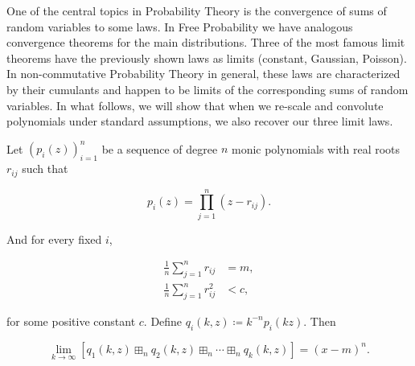 One of the central topics in Probability Theory is the convergence of sums of random variables to some laws. In Free Probability we have analogous convergence theorems for the main distributions. Three of the most famous limit theorems have the previously shown laws as limits (constant, Gaussian, Poisson). In non-commutative Probability Theory in general, these laws are characterized by their cumulants and happen to be limits of the corresponding sums of random variables. In what follows, we will show that when we re-scale and convolute polynomials under standard assumptions, we also recover our three limit laws.

\begin{theorem}
    Let $(p_i(z))_{i=1}^n$ be a sequence of degree $n$ monic polynomials with real roots $r_{ij}$ such that

    \begin{equation*}
        p_i(z) = \prod_{j=1}^n (z - r_{ij}).
    \end{equation*}

    And for every fixed $i$,

    \begin{align*}
        \frac1n\sum_{j=1}^n r_{ij} &= m,\\
        \frac1n\sum_{j=1}^n r_{ij}^2 &< c,
    \end{align*}

    \noindent for some positive constant $c$. Define $q_i(k,z) \coloneqq k^{-n}p_i(kz)$. Then

    \begin{equation*}
        \lim_{k\to \infty} [ q_1(k,z) \boxplus_n q_2(k,z) \boxplus_n \cdots \boxplus_n q_k(k,z) ] = (x-m)^n.
    \end{equation*}
\end{theorem}

